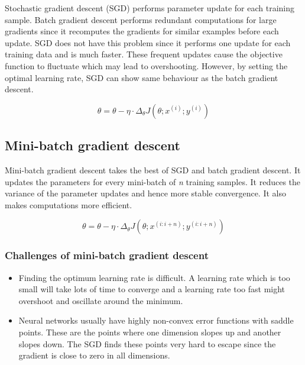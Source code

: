 \documentclass[a4paper, 12pt, oneside, BCOR1cm,toc=chapterentrywithdots]{scrbook}
\begin{document}
Stochastic gradient descent (SGD) performs parameter update for each training sample. Batch gradient descent performs redundant computations for large gradients since it recomputes the gradients for similar examples before each update. SGD does not have this problem since it performs one update for each training data and is much faster. These frequent updates cause the objective function to fluctuate which may lead to overshooting. However, by setting the optimal learning rate, SGD can show same behaviour as the batch gradient descent.

\begin{equation} \label{eqn:4}
\theta = \theta - \eta \cdot \Delta_{\theta} J(\theta; x^{(i)}; y^{(i)})
\end{equation}


\subsection{Mini-batch gradient descent}

Mini-batch gradient descent takes the best of SGD and batch gradient descent. It updates the parameters for every mini-batch of \textit{n} training samples. It reduces the variance of the parameter updates and hence more stable convergence. It also makes computations more efficient. 

\begin{equation} \label{eqn:5}
\theta = \theta - \eta \cdot \Delta_{\theta} J(\theta; x^{(i:i+n)}; y^{(i:i+n)})
\end{equation}


\subsubsection{Challenges of mini-batch gradient descent}

\begin{itemize}
	\item Finding the optimum learning rate is difficult. A learning rate which is too small will take lots of time to converge and a learning rate too fast might overshoot and oscillate around the minimum.
	\item Neural networks usually have highly non-convex error functions with saddle points. These are the points where one dimension slopes up and another slopes down. The SGD finds these points very hard to escape since the gradient is close to zero in all dimensions.
\end{itemize}
\end{document}
